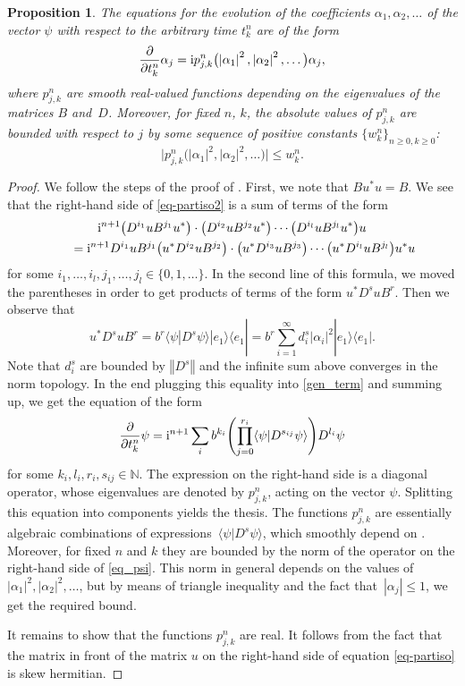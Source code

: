 \documentclass[pdftex]{sigma}
\newtheorem{prop}[thm]{Proposition}
\theoremstyle{definition}
\numberwithin{equation}{section}
\newcommand{\norm}[1]{\left\Vert#1\right\Vert}
\renewcommand{\sc}[2]{\langle #1|#2 \rangle}
\newcommand{\proj}[2]{|#1 \rangle \langle #2|}
\newcommand{\N}{\mathbb N}
\newcommand{\abs}[1]{\left\vert#1\right\vert}
\newcommand{\be}{\begin{equation}}
\newcommand{\ee}{\end{equation}}
\begin{document}
\begin{prop}\label{prop_rank1}
The equations for the evolution of the coefficients $\alpha_1,\alpha_2,\dots$ of the vector $\psi$ with respect to the arbitrary time $t^n_k$ are of the form
\begin{gather*}%
 \frac\partial{\partial t^n_k} \alpha_j = {\rm i} p_{j,k}^n\bigl(\abs{\alpha_1}^2,\abs{\alpha_2}^2,\dots\bigr) \alpha_j,
\end{gather*}
where $p_{j,k}^n$ are smooth real-valued functions depending on the eigenvalues of the matrices $B$ and~$D$. Moreover, for fixed $n$, $k$, the absolute values of $p_{j,k}^n$ are bounded with respect to $j$ by some sequence of positive constants $\{w^n_k\}_{n\geq 0, k\geq 0}$:
\[\bigl|p_{j,k}^n\bigl(\abs{\alpha_1}^2,\abs{\alpha_2}^2,\dots\bigr)\bigr|\leq w^n_k.\]
\end{prop}
\begin{proof}
We follow the steps of the proof of \cite[Proposition 3]{GT-partiso-bial}.
First, we note that $Bu^*u = B$.
We see that the right-hand side of \eqref{eq-partiso2}
is a sum of terms of the form
\begin{gather}
{\rm i}^{n+1} \bigl(D^{i_1} u B^{j_1} u^*\bigr)\cdot \bigl(D^{i_2} u B^{j_2} u^*\bigr) \cdots \bigl(D^{i_l} u B^{j_l} u^*\bigr) u\nonumber
\\
\qquad= {\rm i}^{n+1} D^{i_1} u B^{j_1} \bigl(u^* D^{i_2} u B^{j_2}\bigr) \cdot \bigl(u^* D^{i_3} u B^{j_3}\bigr)\cdots \bigl(u^*D^{i_l} u B^{j_l}\bigr) u^* u\label{gen_term}
\end{gather}
for some $i_1,\dots, i_l, j_1,\dots, j_l\in \{0,1,\dots\}$.
In the second line of this formula, we moved the parentheses in order to get products of terms of the form $u^*D^s u B^r$. Then we observe that
\[
 u^*D^s u B^r = b^r \sc{\psi}{D^s\psi} \proj{e_1}{e_1} = b^r \sum_{i=1}^\infty d_i^s \abs{\alpha_i}^2 \proj{e_1}{e_1} .\]
Note that $d^s_i$ are bounded by $\norm{D^s}$ and the infinite sum above converges in the norm topology. In the end plugging this equality into \eqref{gen_term} and summing up, we get the equation of the form
\be\label{eq_psi}
 \frac\partial{\partial t^n_k} \psi = {\rm i}^{n+1} \sum_i b^{k_i} \Biggl(\prod_{j=0}^{r_i} \sc{\psi}{D^{s_{ij}}\psi}\Biggr) D^{l_i}\psi
\ee
for some $k_i,l_i,r_i,s_{ij}\in\N$. The expression on the right-hand side is a diagonal operator, whose eigenvalues are denoted by $p_{j,k}^n$, acting on the vector $\psi$.
Splitting this equation into components yields the thesis.
The functions $p_{j,k}^n$ are essentially algebraic combinations of expressions~$\sc{\psi}{D^s\psi}$, which smoothly depend on \smash{$\abs{\alpha_1}^2, \abs{\alpha_2}^2, \dots$}. Moreover, for fixed $n$ and $k$ they are bounded by the norm of the operator on the right-hand side of \eqref{eq_psi}. This norm in general depends on the values of $\abs{\alpha_1}^2, \abs{\alpha_2}^2, \dots$, but by means of triangle inequality and the fact that~${\abs{\alpha_j}\leq 1}$, we get the required bound.

It remains to show that the functions $p_{j,k}^n$ are real. It follows from the fact that the matrix in front of the matrix $u$ on the right-hand side of equation \eqref{eq-partiso} is skew hermitian.
\end{proof}
\end{document}
